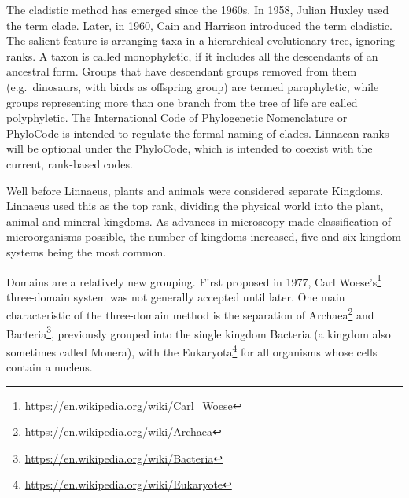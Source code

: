 \documentclass[]{book}
\let\rmarkdownfootnote\footnote%
\def\footnote{\protect\rmarkdownfootnote}
\renewcommand{\href}[2]{#2\footnote{\url{#1}}}
\theoremstyle{definition}
\theoremstyle{definition}
\theoremstyle{definition}
\theoremstyle{remark}
\begin{document}
\begin{enumerate}
The cladistic method has emerged since the 1960s. In 1958, Julian Huxley
used the term clade. Later, in 1960, Cain and Harrison introduced the
term cladistic. The salient feature is arranging taxa in a hierarchical
evolutionary tree, ignoring ranks. A taxon is called monophyletic, if it
includes all the descendants of an ancestral form. Groups that have
descendant groups removed from them (e.g.~dinosaurs, with birds as
offspring group) are termed paraphyletic, while groups representing more
than one branch from the tree of life are called polyphyletic. The
International Code of Phylogenetic Nomenclature or PhyloCode is intended
to regulate the formal naming of clades. Linnaean ranks will be optional
under the PhyloCode, which is intended to coexist with the current,
rank-based codes.

Well before Linnaeus, plants and animals were considered separate
Kingdoms. Linnaeus used this as the top rank, dividing the physical
world into the plant, animal and mineral kingdoms. As advances in
microscopy made classification of microorganisms possible, the number of
kingdoms increased, five and six-kingdom systems being the most common.

Domains are a relatively new grouping. First proposed in 1977,
\href{https://en.wikipedia.org/wiki/Carl_Woese}{Carl Woese's}
three-domain system was not generally accepted until later. One main
characteristic of the three-domain method is the separation of \href{https://en.wikipedia.org/wiki/Archaea}{Archaea}
and \href{https://en.wikipedia.org/wiki/Bacteria}{Bacteria}, previously grouped into the single kingdom Bacteria (a
kingdom also sometimes called Monera), with the \href{https://en.wikipedia.org/wiki/Eukaryote}{Eukaryota} for all
organisms whose cells contain a nucleus.

\begin{figure}


\end{figure}
\end{enumerate}
\end{document}
